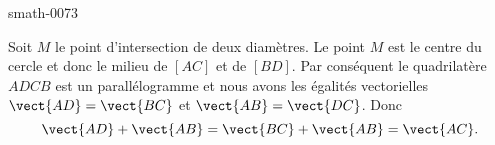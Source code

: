 
\begin{corrige}{smath-0073}

    \begin{multicols}{2}
        Soit \( M\) le point d'intersection de deux diamètres. Le point \( M\) est le centre du cercle et donc le milieu de \( [AC]\) et de \( [BD]\). Par conséquent le quadrilatère \( ADCB\) est un parallélogramme et nous avons les égalités vectorielles \( \vect{ AD }=\vect{ BC }\) et \( \vect{ AB }=\vect{ DC }\). Donc
        \begin{equation}
            \vect{ AD }+\vect{ AB }=\vect{ BC }+\vect{ AB }=\vect{ AC }.
        \end{equation}

    \columnbreak

    \begin{center}

    \end{center}

    \end{multicols}


\end{corrige}
